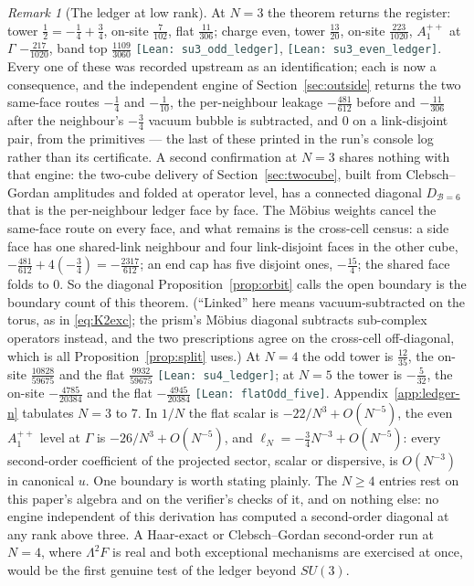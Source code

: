 \documentclass[11pt]{article}
\theoremstyle{plain}
\theoremstyle{definition}
\theoremstyle{remark}
\newtheorem{remark}[theorem]{Remark}
\newcommand{\chk}[1]{}
\newcommand{\leanref}[1]{{\footnotesize\textcolor{DarkSlateGray}{\texttt{[Lean: #1]}}}}
\begin{document}
\begin{remark}[The ledger at low rank]
At $N=3$ the theorem returns the register: tower $\tfrac12=-\tfrac14+\tfrac34$,
on-site $\tfrac7{102}$, flat $\tfrac{11}{306}$; charge even, tower
$\tfrac{13}{20}$, on-site $\tfrac{223}{1020}$, $A_1^{++}$ at $\Gamma$
$-\tfrac{217}{1020}$, band top $\tfrac{1109}{3060}$
\leanref{su3\_odd\_ledger}, \leanref{su3\_even\_ledger}. Every one of these
was recorded upstream as an identification; each is now a consequence, and
the independent engine of Section~\ref{sec:outside} returns the two same-face
routes $-\tfrac14$ and $-\tfrac1{10}$, the per-neighbour leakage
$-\tfrac{481}{612}$ before and $-\tfrac{11}{306}$ after the neighbour's
$-\tfrac34$ vacuum bubble is subtracted, and $0$ on a link-disjoint pair,
from the primitives --- the last of
these printed in the run's console log rather than its certificate. A second
confirmation at $N=3$ shares nothing with that engine: the two-cube delivery
of Section~\ref{sec:twocube}, built from Clebsch--Gordan amplitudes and folded
at operator level, has a connected diagonal $D_{\mathcal B=6}$ that is the
per-neighbour ledger face by face. The M\"obius weights cancel the same-face
route on every face, and what remains is the cross-cell census: a side face
has one shared-link neighbour and four link-disjoint faces in the other cube,
$-\tfrac{481}{612}+4(-\tfrac34)=-\tfrac{2317}{612}$; an end cap has five
disjoint ones, $-\tfrac{15}4$; the shared face folds to $0$. So the diagonal
Proposition~\ref{prop:orbit} calls the open boundary is the boundary count of
this theorem. (``Linked'' here means vacuum-subtracted on the torus, as in
\eqref{eq:K2exc}; the prism's M\"obius diagonal subtracts sub-complex
operators instead, and the two prescriptions agree on the cross-cell
off-diagonal, which is all Proposition~\ref{prop:split} uses.) At $N=4$ the
odd tower is $\tfrac{12}{35}$, the on-site $\tfrac{10828}{59675}$ and the
flat $\tfrac{9932}{59675}$ \leanref{su4\_ledger}; at $N=5$ the tower is
$-\tfrac5{32}$, the on-site $-\tfrac{4785}{20384}$ and the flat
$-\tfrac{4945}{20384}$ \leanref{flatOdd\_five}. Appendix~\ref{app:ledger-n}
tabulates $N=3$ to $7$. In $1/N$ the flat scalar is $-22/N^3+O(N^{-5})$, the
even $A_1^{++}$ level at $\Gamma$ is $-26/N^3+O(N^{-5})$, and
$\ell_N=-\tfrac34N^{-3}+O(N^{-5})$: every second-order coefficient of the
projected sector, scalar or dispersive, is $O(N^{-3})$ in canonical $u$. One
boundary is worth stating plainly. The $N\ge4$ entries rest on this paper's
algebra and on the verifier's checks of it, and on nothing else: no engine
independent of this derivation has computed a second-order diagonal at any
rank above three. A Haar-exact or Clebsch--Gordan second-order run at $N=4$,
where $\Lambda^2F$ is real and both exceptional mechanisms are exercised at
once, would be the first genuine test of the ledger beyond $SU(3)$.
\chk{at N = 3 the all-rank second-order ledger is the register and an independent engine's table, line by line}
\chk{the two-cube B=6 connected diagonal is the per-neighbour ledger face by face: one shared-link neighbour and four disjoint faces in the other cube}
\chk{the large-N second-order ledger: the towers and flat scalar are O(N\^{}-3), and the leading same-face and bubble terms cancel}
\end{remark}
\end{document}

